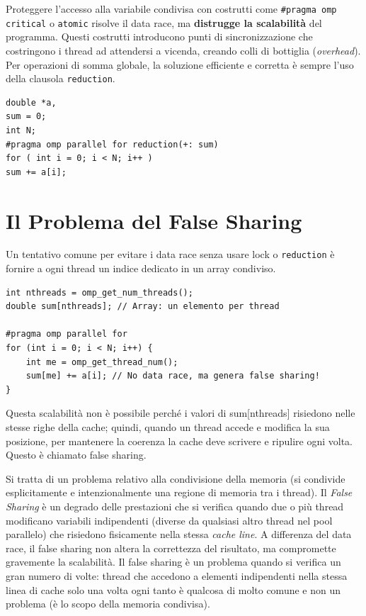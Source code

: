 \noindent
Proteggere l'accesso alla variabile condivisa con costrutti come \texttt{\#pragma omp critical} o \texttt{atomic} risolve il data race, ma \textbf{distrugge la scalabilità} del programma. Questi costrutti introducono punti di sincronizzazione che costringono i thread ad attendersi a vicenda, creando colli di bottiglia (\textit{overhead}). Per operazioni di somma globale, la soluzione efficiente e corretta è sempre l'uso della clausola \texttt{reduction}.

\begin{verbatim}
double *a,
sum = 0;
int N;
#pragma omp parallel for reduction(+: sum)
for ( int i = 0; i < N; i++ )
sum += a[i];
\end{verbatim}

\section{Il Problema del False Sharing}

Un tentativo comune per evitare i data race senza usare lock o \texttt{reduction} è fornire a ogni thread un indice dedicato in un array condiviso.

\begin{verbatim}
int nthreads = omp_get_num_threads();
double sum[nthreads]; // Array: un elemento per thread

#pragma omp parallel for
for (int i = 0; i < N; i++) {
    int me = omp_get_thread_num();
    sum[me] += a[i]; // No data race, ma genera false sharing!
}
\end{verbatim}

\noindent
Questa scalabilità non è possibile perché i valori di sum[nthreads] risiedono nelle stesse righe della cache; quindi, quando un thread accede e modifica la sua posizione, per mantenere la coerenza la cache
deve scrivere e ripulire ogni volta. Questo è chiamato false sharing.

\vspace{0.3cm}
\noindent
Si tratta di un problema relativo alla condivisione della memoria (si condivide esplicitamente e intenzionalmente una regione di
memoria tra i thread). 
Il \textit{False Sharing} è un degrado delle prestazioni che si verifica quando due o più thread modificano variabili indipendenti (diverse
da qualsiasi altro thread nel pool parallelo) che risiedono fisicamente nella stessa \textit{cache line}. A differenza del data race, il false sharing non altera la correttezza del risultato, ma compromette gravemente la scalabilità. 
Il false sharing è un problema quando si verifica un gran numero di volte: thread che accedono a elementi indipendenti nella stessa linea di cache solo una volta ogni tanto è qualcosa di molto comune e non un problema (è lo scopo della memoria condivisa).

